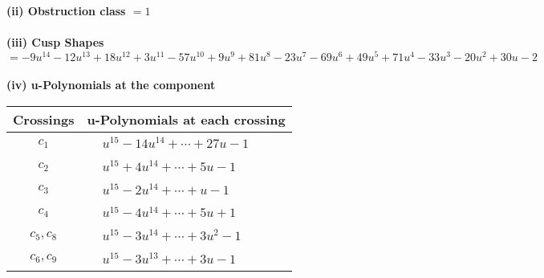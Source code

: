 \documentclass[1p]{elsarticle_modified}
\theoremstyle{definition}
\begin{document}
\flushleft \textbf{(ii) Obstruction class $= 1$}\\~\\
\flushleft \textbf{(iii) Cusp Shapes $= -9 u^{14}-12 u^{13}+18 u^{12}+3 u^{11}-57 u^{10}+9 u^9+81 u^8-23 u^7-69 u^6+49 u^5+71 u^4-33 u^3-20 u^2+30 u-2$}\\~\\
\newpage\renewcommand{\arraystretch}{1}
\flushleft \textbf{(iv) u-Polynomials at the component}\newline \\
\begin{tabular}{m{50pt}|m{274pt}}
Crossings & \hspace{64pt}u-Polynomials at each crossing \\
\hline $$\begin{aligned}c_{1}\end{aligned}$$&$\begin{aligned}
&u^{15}-14 u^{14}+\cdots+27 u-1
\end{aligned}$\\
\hline $$\begin{aligned}c_{2}\end{aligned}$$&$\begin{aligned}
&u^{15}+4 u^{14}+\cdots+5 u-1
\end{aligned}$\\
\hline $$\begin{aligned}c_{3}\end{aligned}$$&$\begin{aligned}
&u^{15}-2 u^{14}+\cdots+u-1
\end{aligned}$\\
\hline $$\begin{aligned}c_{4}\end{aligned}$$&$\begin{aligned}
&u^{15}-4 u^{14}+\cdots+5 u+1
\end{aligned}$\\
\hline $$\begin{aligned}c_{5},c_{8}\end{aligned}$$&$\begin{aligned}
&u^{15}-3 u^{14}+\cdots+3 u^2-1
\end{aligned}$\\
\hline $$\begin{aligned}c_{6},c_{9}\end{aligned}$$&$\begin{aligned}
&u^{15}-3 u^{13}+\cdots+3 u-1
\end{aligned}$\\

\end{tabular}
\end{document}
